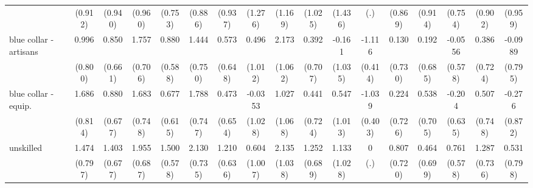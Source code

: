 {\begin{tabular}{l*{16}{c}}
                    &     (0.912)         &     (0.940)         &     (0.960)         &     (0.753)         &     (0.886)         &     (0.937)         &     (1.276)         &     (1.169)         &     (1.025)         &     (1.436)         &         (.)         &     (0.869)         &     (0.914)         &     (0.754)         &     (0.902)         &     (0.959)         \\
[1em]
blue collar - artisans&       0.996         &       0.850         &       1.757\sym{*}  &       0.880         &       1.444         &       0.573         &       0.496         &       2.173\sym{*}  &       0.392         &      -0.161         &      -1.116\sym{**} &       0.130         &       0.192         &     -0.0556         &       0.386         &     -0.0989         \\
                    &     (0.800)         &     (0.661)         &     (0.706)         &     (0.588)         &     (0.750)         &     (0.648)         &     (1.012)         &     (1.062)         &     (0.707)         &     (1.035)         &     (0.414)         &     (0.730)         &     (0.685)         &     (0.578)         &     (0.724)         &     (0.795)         \\
[1em]
blue collar - equip.&       1.686\sym{*}  &       0.880         &       1.683\sym{*}  &       0.677         &       1.788\sym{*}  &       0.473         &     -0.0353         &       1.027         &       0.441         &       0.547         &      -1.039\sym{**} &       0.224         &       0.538         &      -0.204         &       0.507         &      -0.276         \\
                    &     (0.814)         &     (0.677)         &     (0.748)         &     (0.615)         &     (0.747)         &     (0.654)         &     (1.028)         &     (1.068)         &     (0.724)         &     (1.013)         &     (0.403)         &     (0.726)         &     (0.705)         &     (0.635)         &     (0.748)         &     (0.872)         \\
[1em]
unskilled           &       1.474         &       1.403\sym{*}  &       1.955\sym{**} &       1.500\sym{**} &       2.130\sym{**} &       1.210         &       0.604         &       2.135\sym{*}  &       1.252         &       1.133         &           0         &       0.807         &       0.464         &       0.761         &       1.287         &       0.531         \\
                    &     (0.797)         &     (0.677)         &     (0.687)         &     (0.578)         &     (0.735)         &     (0.636)         &     (1.007)         &     (1.038)         &     (0.689)         &     (1.028)         &         (.)         &     (0.720)         &     (0.699)         &     (0.578)         &     (0.736)         &     (0.798)         \\

\end{tabular}}
